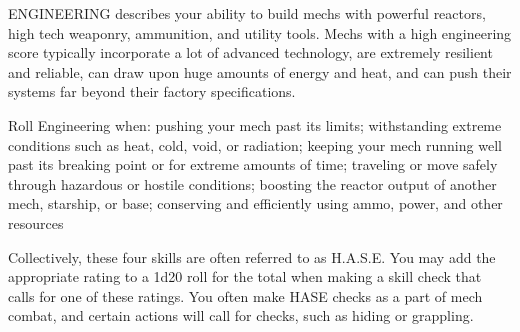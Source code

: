 ENGINEERING describes your ability to build mechs with powerful reactors, high tech weaponry,
ammunition, and utility tools. Mechs with a high engineering score typically incorporate a lot of
advanced technology, are extremely resilient and reliable, can draw upon huge amounts of energy
and heat, and can push their systems far beyond their factory specifications.

Roll Engineering when: pushing your mech past its limits; withstanding extreme conditions such
as heat, cold, void, or radiation; keeping your mech running well past its breaking point or for
extreme amounts of time; traveling or move safely through hazardous or hostile conditions;
boosting the reactor output of another mech, starship, or base; conserving and efficiently using
ammo, power, and other resources

Collectively, these four skills are often referred to as H.A.S.E. You may add the appropriate rating
to a 1d20 roll for the total when making a skill check that calls for one of these ratings. You often
make HASE checks as a part of mech combat, and certain actions will call for checks, such as
hiding or grappling.